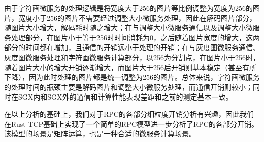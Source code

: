 由于字符画微服务的处理逻辑是将宽度大于256的图片等比例调整为宽度为256的图片，宽度小于256的图片不需要经过调整大小微服务处理，因此在解码图片部分，随图片大小增大，解码耗时随之增大；在与调整大小微服务通信以及调整大小微服务处理部分，在图片小于等于256时时间消耗为0，之后随着图片宽度的增大，这两部分的时间都在增加，且通信的开销远小于处理的开销；在与灰度图微服务通信、灰度图微服务处理和字符画微服务计算部分，以256为分割点，在图片小于256时，随着图片大小的增大开销逐渐增大，而图片大于256后开销则基本稳定（甚至有所下降），因为此时处理的图片都是统一调整为256的图片。总体来说，字符画微服务的处理时间的瓶颈主要是解码图片和调整大小微服务处理，而通信开销则较小；同时在SGX内和SGX外的通信和计算性能表现差距和之前的测定基本一致。

在以上分析的基础上，我们对于RPC的各部分细粒度开销分析有兴趣，因此我们在Rust TCP基础上实现了一个简单的RPC模型进一步分析了RPC的各部分开销。该模型的场景是矩阵运算，也是一种合适的微服务计算场景。

